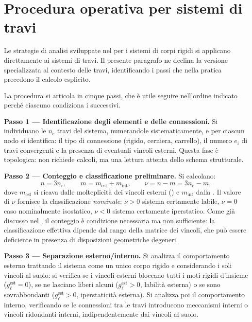 \section{Procedura operativa per sistemi di travi}
\label{sec:procedura_operativa}

Le strategie di analisi sviluppate nel
 per i sistemi di
corpi rigidi si applicano direttamente ai sistemi di
travi. Il presente paragrafo ne declina la versione
specializzata al contesto delle travi, identificando
i passi che nella pratica precedono il calcolo esplicito.

La procedura si articola in cinque passi, che è utile
seguire nell'ordine indicato perché ciascuno condiziona
i successivi.

\medskip
\noindent\textbf{Passo 1 — Identificazione degli elementi
	e delle connessioni.}
Si individuano le $n_e$ travi del sistema, numerandole
sistematicamente, e per ciascun nodo si identifica:
il tipo di connessione (rigido, cerniera, carrello),
il numero $e_i$ di travi convergenti e la presenza
di eventuali vincoli esterni. Questa fase è topologica:
non richiede calcoli, ma una lettura attenta dello
schema strutturale.

\medskip
\noindent\textbf{Passo 2 — Conteggio e classificazione
	preliminare.}
Si calcolano:
\begin{equation}\label{eq:conteggio_travi}
	n = 3n_e, \qquad
	m = m_{\text{est}} + m_{\text{int}}, \qquad
	\nu = n - m = 3n_e - m,
\end{equation}
dove $m_{\text{est}}$ si ricava dalle molteplicità dei
vincoli esterni () e
$m_{\text{int}}$ dalla .
Il valore di $\nu$ fornisce la classificazione
\emph{nominale}: $\nu > 0$ sistema certamente labile,
$\nu = 0$ caso nominalmente isostatico, $\nu < 0$
sistema certamente iperstatico. Come già discusso nel
, il conteggio è
condizione necessaria ma non sufficiente: la
classificazione effettiva dipende dal rango della
matrice dei vincoli, che può essere deficiente in
presenza di disposizioni geometriche degeneri.

\medskip
\noindent\textbf{Passo 3 — Separazione esterno/interno.}
Si analizza il comportamento esterno trattando il sistema
come un unico corpo rigido e considerando i soli vincoli
al suolo: si verifica se i vincoli esterni bloccano
tutti i moti rigidi d'insieme ($g_\ell^{\text{est}} = 0$),
se ne lasciano liberi alcuni ($g_\ell^{\text{est}} > 0$,
labilità esterna) o se sono sovrabbondanti
($g_{\mathscr{i}}^{\text{est}} > 0$, iperstaticità
esterna). Si analizza poi il comportamento interno,
verificando se le connessioni tra le travi introducono
meccanismi interni o vincoli ridondanti interni,
indipendentemente dai vincoli al suolo.

